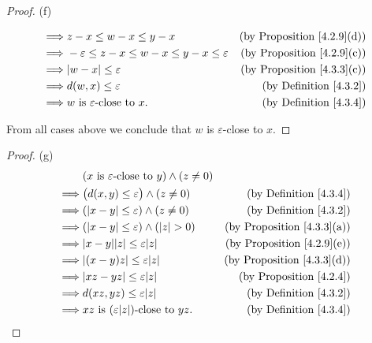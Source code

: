 \begin{proof}{(f)}
\begin{itemize}
\begin{align*}
                  \implies & z - x \leq w - x \leq y - x                                    & \text{(by Proposition \ref{4.2.9}(d))} \\
                  \implies & -\varepsilon \leq z - x \leq w - x \leq y - x \leq \varepsilon & \text{(by Proposition \ref{4.2.9}(c))} \\
                  \implies & \abs{w - x} \leq \varepsilon                                   & \text{(by Proposition \ref{4.3.3}(c))} \\
                  \implies & d(w, x) \leq \varepsilon                                       & \text{(by Definition \ref{4.3.2})}     \\
                  \implies & w \text{ is } \varepsilon\text{-close to } x.                  & \text{(by Definition \ref{4.3.4})}
              \end{align*}
    \end{itemize}
    From all cases above we conclude that \(w\) is \(\varepsilon\)-close to \(x\).
\end{proof}

\begin{proof}{(g)}
    \begin{align*}
                 & (x \text{ is } \varepsilon\text{-close to } y) \land (z \neq 0)                                          \\
        \implies & \big(d(x, y) \leq \varepsilon\big) \land (z \neq 0)             & \text{(by Definition \ref{4.3.4})}     \\
        \implies & (\abs{x - y} \leq \varepsilon) \land (z \neq 0)                 & \text{(by Definition \ref{4.3.2})}     \\
        \implies & (\abs{x - y} \leq \varepsilon) \land (\abs{z} > 0)              & \text{(by Proposition \ref{4.3.3}(a))} \\
        \implies & \abs{x - y} \abs{z} \leq \varepsilon \abs{z}                    & \text{(by Proposition \ref{4.2.9}(e))} \\
        \implies & \abs{(x - y)z} \leq \varepsilon \abs{z}                         & \text{(by Proposition \ref{4.3.3}(d))} \\
        \implies & \abs{xz - yz} \leq \varepsilon \abs{z}                          & \text{(by Proposition \ref{4.2.4})}    \\
        \implies & d(xz, yz) \leq \varepsilon \abs{z}                              & \text{(by Definition \ref{4.3.2})}     \\
        \implies & xz \text{ is } (\varepsilon \abs{z})\text{-close to } yz.       & \text{(by Definition \ref{4.3.4})}
    \end{align*}
\end{proof}


